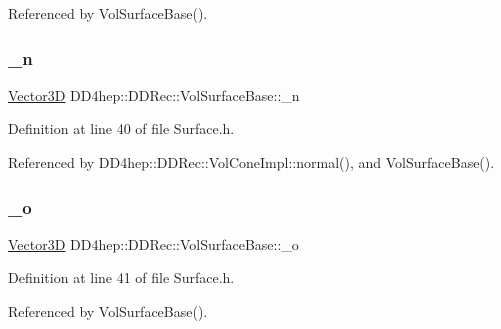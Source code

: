 Referenced by Vol\+Surface\+Base().

\hypertarget{class_d_d4hep_1_1_d_d_rec_1_1_vol_surface_base_a9371dc34ec00ff652bc4e0ae1423364c}{}\label{class_d_d4hep_1_1_d_d_rec_1_1_vol_surface_base_a9371dc34ec00ff652bc4e0ae1423364c} 
\subsubsection{\texorpdfstring{\+\_\+n}{\_n}}
{\footnotesize\ttfamily \hyperlink{class_d_d_surfaces_1_1_vector3_d}{Vector3D} D\+D4hep\+::\+D\+D\+Rec\+::\+Vol\+Surface\+Base\+::\+\_\+n\hspace{0.3cm}{\ttfamily [protected]}}



Definition at line 40 of file Surface.\+h.



Referenced by D\+D4hep\+::\+D\+D\+Rec\+::\+Vol\+Cone\+Impl\+::normal(), and Vol\+Surface\+Base().

\hypertarget{class_d_d4hep_1_1_d_d_rec_1_1_vol_surface_base_a2a59cf024e571ecddb719beadca6aa5e}{}\label{class_d_d4hep_1_1_d_d_rec_1_1_vol_surface_base_a2a59cf024e571ecddb719beadca6aa5e} 
\subsubsection{\texorpdfstring{\+\_\+o}{\_o}}
{\footnotesize\ttfamily \hyperlink{class_d_d_surfaces_1_1_vector3_d}{Vector3D} D\+D4hep\+::\+D\+D\+Rec\+::\+Vol\+Surface\+Base\+::\+\_\+o\hspace{0.3cm}{\ttfamily [protected]}}



Definition at line 41 of file Surface.\+h.



Referenced by Vol\+Surface\+Base().

\hypertarget{class_d_d4hep_1_1_d_d_rec_1_1_vol_surface_base_a3745bfba5f2d3b296e4f628c399faa39}{}\label{class_d_d4hep_1_1_d_d_rec_1_1_vol_surface_base_a3745bfba5f2d3b296e4f628c399faa39} 
